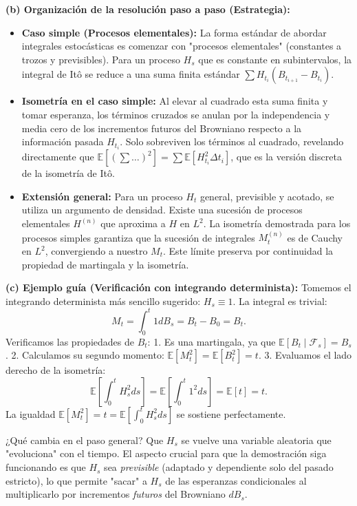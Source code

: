 \documentclass[11pt, letterpaper]{article}
\begin{document}
\begin{solucion}
    \textbf{(b) Organización de la resolución paso a paso (Estrategia):}
    \begin{itemize}
        \item[(i)] \textbf{Caso simple (Procesos elementales):} La forma estándar de abordar integrales estocásticas es comenzar con "procesos elementales" (constantes a trozos y previsibles). Para un proceso $H_s$ que es constante en subintervalos, la integral de Itô se reduce a una suma finita estándar $\sum H_{t_i} (B_{t_{i+1}} - B_{t_i})$.
        \item[(ii)] \textbf{Isometría en el caso simple:} Al elevar al cuadrado esta suma finita y tomar esperanza, los términos cruzados se anulan por la independencia y media cero de los incrementos futuros del Browniano respecto a la información pasada $H_{t_i}$. Solo sobreviven los términos al cuadrado, revelando directamente que $\mathbb{E}[(\sum \dots)^2] = \sum \mathbb{E}[H_{t_i}^2 \Delta t_i]$, que es la versión discreta de la isometría de Itô.
        \item[(iii)] \textbf{Extensión general:} Para un proceso $H_t$ general, previsible y acotado, se utiliza un argumento de densidad. Existe una sucesión de procesos elementales $H^{(n)}$ que aproxima a $H$ en $L^2$. La isometría demostrada para los procesos simples garantiza que la sucesión de integrales $M_t^{(n)}$ es de Cauchy en $L^2$, convergiendo a nuestro $M_t$. Este límite preserva por continuidad la propiedad de martingala y la isometría.
    \end{itemize}

    \vspace{3mm}
    \textbf{(c) Ejemplo guía (Verificación con integrando determinista):}
    Tomemos el integrando determinista más sencillo sugerido: $H_s \equiv 1$. 
    La integral es trivial:
    \[ M_t = \int_0^t 1 dB_s = B_t - B_0 = B_t. \]
    Verificamos las propiedades de $B_t$:
    1. Es una martingala, ya que $\mathbb{E}[B_t \mid \mathcal{F}_s] = B_s$.
    2. Calculamos su segundo momento: $\mathbb{E}[M_t^2] = \mathbb{E}[B_t^2] = t$.
    3. Evaluamos el lado derecho de la isometría:
    \[ \mathbb{E}\left[ \int_0^t H_s^2 ds \right] = \mathbb{E}\left[ \int_0^t 1^2 ds \right] = \mathbb{E}[t] = t. \]
    La igualdad $\mathbb{E}[M_t^2] = t = \mathbb{E}[\int_0^t H_s^2 ds]$ se sostiene perfectamente.
    
    ¿Qué cambia en el paso general? Que $H_s$ se vuelve una variable aleatoria que "evoluciona" con el tiempo. El aspecto crucial para que la demostración siga funcionando es que $H_s$ sea \textit{previsible} (adaptado y dependiente solo del pasado estricto), lo que permite "sacar" a $H_s$ de las esperanzas condicionales al multiplicarlo por incrementos \textit{futuros} del Browniano $dB_s$.


\end{solucion}
\end{document}
